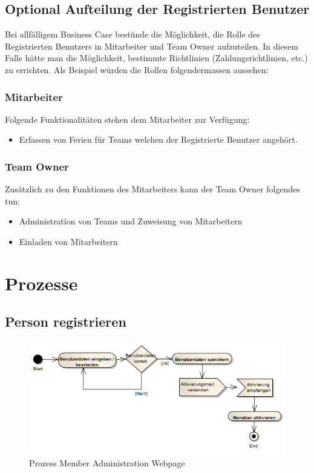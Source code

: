 \subsection{Optional Aufteilung der Registrierten Benutzer}
Bei allf\"alligem Business Case best\"unde die M\"oglichkeit, die Rolle des Registrierten Benutzers in Mitarbeiter und Team Owner aufzuteilen. In diesem Falle h\"atte man die M\"oglichkeit, bestimmte Richtlinien (Zahlungsrichtlinien, etc.) zu errichten. Als Beispiel w\"urden die Rollen folgendermassen aussehen:
\subsubsection{Mitarbeiter}
Folgende Funktionalit\"aten stehen dem Mitarbeiter zur Verf\"ugung:
\begin{itemize}
\item Erfassen von Ferien f\"ur Teams welchen der Registrierte Benutzer angeh\"ort.
\end{itemize}

\subsubsection{Team Owner}
Zus\"atzlich zu den Funktionen des Mitarbeiters kann der Team Owner folgendes tun:
\begin{itemize}
\item Administration von Teams und Zuweisung von Mitarbeitern
\item Einladen von Mitarbeitern
\end{itemize}

\section{Prozesse}\label{konzept:prozesse}
\subsection{Person registrieren}
 \begin{figure}[H]
  	\centering
    	\includegraphics[width=15cm]{images/process_registration}
 	\caption{Prozess Member Administration Webpage}
\end{figure}

